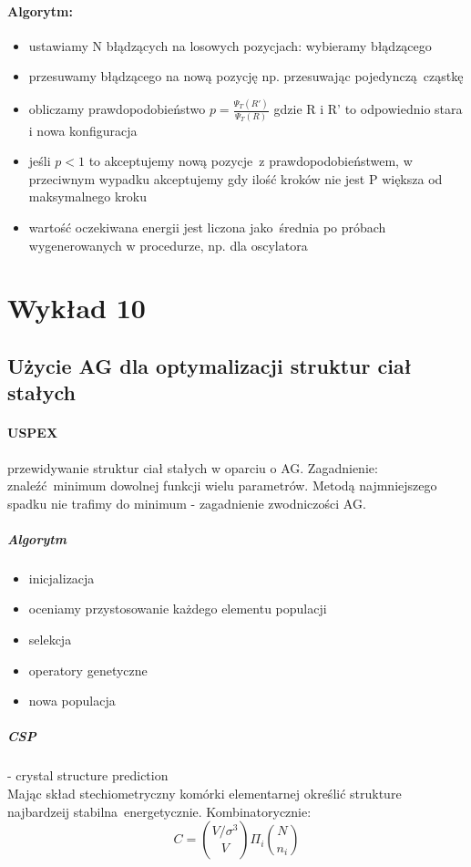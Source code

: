 \documentclass{article}
\begin{document}
	        \paragraph{Algorytm:}
	        \begin{itemize}
	        	\item ustawiamy N błądzących na losowych pozycjach: wybieramy błądzącego
	        	\item przesuwamy błądzącego na nową pozycję np. przesuwając pojedynczą cząstkę
	        	\item obliczamy prawdopodobieństwo $p=\frac{\Psi_T(R')}{\Psi_T(R)}$ gdzie R i R' to odpowiednio stara i nowa konfiguracja
	        	\item jeśli $p < 1$ to akceptujemy nową pozycje z prawdopodobieństwem, w przeciwnym wypadku akceptujemy gdy ilość kroków nie jest P większa od maksymalnego kroku
	        	\item wartość oczekiwana energii jest liczona jako średnia po próbach wygenerowanych w procedurze, np. dla oscylatora
	        \end{itemize}
	        \section{Wykład 10}
	        \subsection{Użycie AG dla optymalizacji struktur ciał stałych}
	        \paragraph{USPEX} przewidywanie struktur ciał stałych w oparciu o AG. Zagadnienie: znaleźć minimum dowolnej funkcji wielu parametrów. Metodą najmniejszego spadku nie trafimy do minimum - zagadnienie zwodniczości AG.
	        \subparagraph{Algorytm}
			\begin{itemize}
				\item inicjalizacja
				\item oceniamy przystosowanie każdego elementu populacji
				\item selekcja 
				\item operatory genetyczne 
				\item nowa populacja 
			\end{itemize} 			
			\subparagraph{CSP} - crystal structure prediction \\
			Mając skład stechiometryczny komórki elementarnej określić strukture najbardzeij stabilna energetycznie. Kombinatorycznie:
			$$C = \binom{V / \sigma^3}{V}\Pi_i \binom{N}{n_i}$$
			
\end{document}
